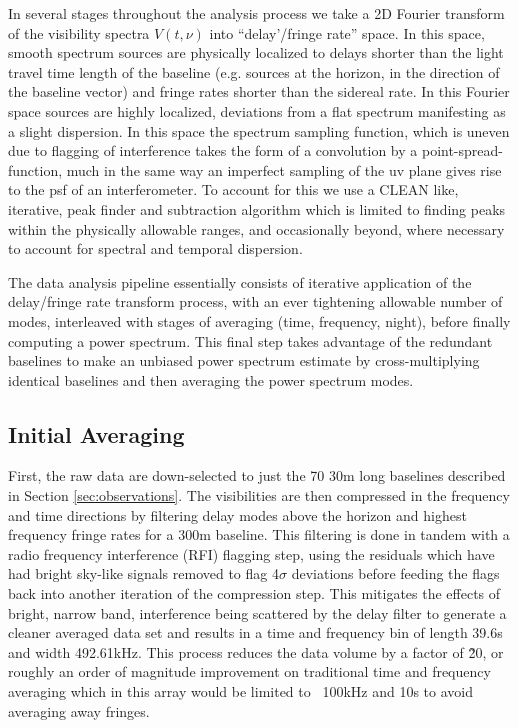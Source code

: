 \documentclass[preprint]{aastex}
\begin{document}
In several stages throughout the analysis process we take a 2D Fourier transform of the visibility spectra $V(t,\nu)$ into ``delay'/fringe rate'' space.  In this space, smooth spectrum sources are physically localized to delays shorter than the light travel time length of the baseline (e.g. sources at the horizon, in the direction of the baseline vector) and fringe rates shorter than the sidereal rate.  In this Fourier space sources are highly localized, deviations from a flat spectrum manifesting as a slight dispersion. In this space the spectrum sampling function, which is uneven due to flagging of interference takes the form of a convolution by a point-spread-function, much in the same way an imperfect sampling of the uv plane gives rise to the psf of an interferometer.  To account for this we use a CLEAN like, iterative, peak finder and subtraction algorithm which is limited to finding peaks within the physically allowable ranges, and occasionally beyond, where necessary to account for spectral and temporal dispersion. 

The data analysis pipeline essentially consists of iterative application of the delay/fringe rate transform process, with an ever tightening allowable number of modes, interleaved with stages of averaging (time, frequency, night), before finally computing a power spectrum.  This final step takes advantage of the redundant baselines to make an unbiased power spectrum estimate by cross-multiplying identical baselines and then averaging the power spectrum modes. 


\subsection{Initial Averaging}
  First, the raw data are down-selected to just the 70 30m long baselines described in Section \ref{sec:observations}.  %
   The visibilities are then compressed in the frequency and time directions by filtering delay modes above the horizon and highest frequency fringe rates for a 300m baseline.  This filtering is done in tandem with a radio frequency interference (RFI) flagging step, using the residuals which have had bright sky-like signals removed to flag 4$\sigma$ deviations before feeding the flags back into another iteration of the compression step. This mitigates the effects of bright, narrow band, interference  being scattered by the delay filter to generate a cleaner averaged data set and results in a time and frequency bin of length 39.6s and width 492.61kHz. 
  This process reduces the data volume by a factor of \~20, or roughly an order of magnitude improvement on traditional time and frequency averaging which in this array would be limited to ~100kHz and 10s to avoid averaging away fringes.
  
\end{document}
